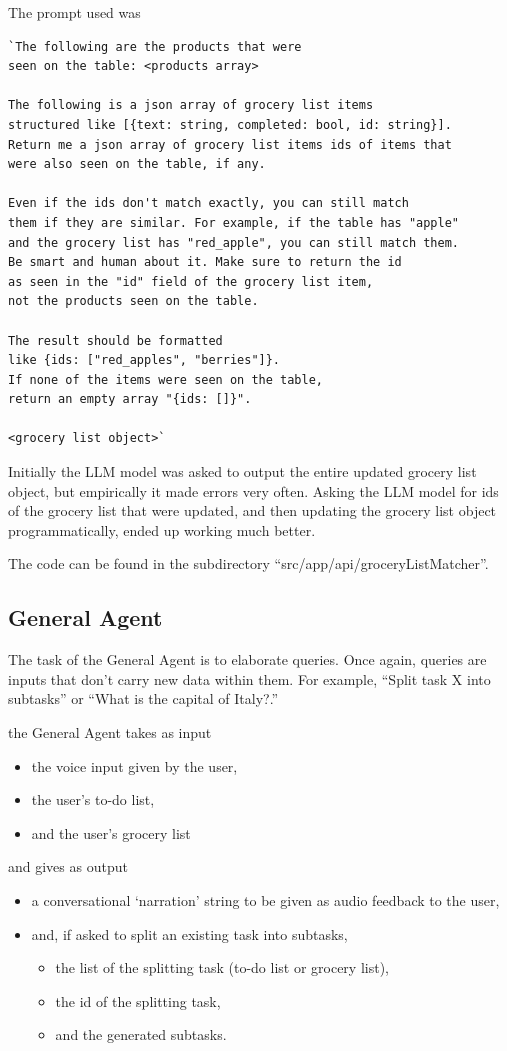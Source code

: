 \documentclass{article}
\begin{document}
The prompt used was
\begin{verbatim}
`The following are the products that were
seen on the table: <products array>

The following is a json array of grocery list items
structured like [{text: string, completed: bool, id: string}].
Return me a json array of grocery list items ids of items that
were also seen on the table, if any.

Even if the ids don't match exactly, you can still match
them if they are similar. For example, if the table has "apple"
and the grocery list has "red_apple", you can still match them.
Be smart and human about it. Make sure to return the id
as seen in the "id" field of the grocery list item,
not the products seen on the table.

The result should be formatted
like {ids: ["red_apples", "berries"]}.
If none of the items were seen on the table,
return an empty array "{ids: []}".       

<grocery list object>`
\end{verbatim}

Initially the LLM model was asked to output the entire updated grocery list object, but empirically it made errors very often.
Asking the LLM model for ids of the grocery list that were updated, and then updating the grocery list object programmatically, ended up working much better.

The code can be found in the subdirectory ``src/app/api/groceryListMatcher''.

\subsection*{\color{draculayellow}General Agent}

The task of the General Agent is to elaborate queries. Once again, queries are inputs that don't carry new data within them. For example, ``Split task X into subtasks'' or ``What is the capital of Italy?.''

the General Agent takes as input
\begin{itemize}
  \item the voice input given by the user,
  \item the user's to-do list,
  \item and the user's grocery list
\end{itemize}
and gives as output
\begin{itemize}
  \item a conversational `narration' string to be given as audio feedback to the user,
  \item and, if asked to split an existing task into subtasks,
  \begin{itemize}
    \item the list of the splitting task (to-do list or grocery list),
    \item the id of the splitting task,
    \item and the generated subtasks.
  \end{itemize}
\end{itemize}
\end{document}
